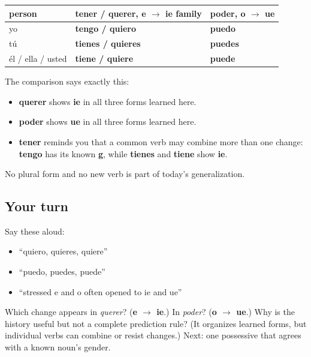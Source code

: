 \begin{grammarlens}[title={Grammar Lens: two changes, one learned frame}]
\noindent
\begin{tabularx}{\linewidth}{@{}>{\raggedright\arraybackslash}X>{\raggedright\arraybackslash}X>{\raggedright\arraybackslash}X@{}}
\toprule
\textbf{person} & \textbf{\textbf{tener / querer}, e $\to$ ie family} & \textbf{\textbf{poder}, o $\to$ ue} \\
\midrule
yo & \textbf{tengo / quiero} & \textbf{puedo} \\
tú & \textbf{tienes / quieres} & \textbf{puedes} \\
él / ella / usted & \textbf{tiene / quiere} & \textbf{puede} \\
\bottomrule
\end{tabularx}

The comparison says exactly this:

\begin{itemize}
\raggedright
  \item \textbf{querer} shows \textbf{ie} in all three forms learned here.
  \item \textbf{poder} shows \textbf{ue} in all three forms learned here.
  \item \textbf{tener} reminds you that a common verb may combine more than one change: \textbf{tengo} has its known \textbf{g}, while \textbf{tienes} and \textbf{tiene} show \textbf{ie}.
\end{itemize}

No plural form and no new verb is part of today's generalization.
\end{grammarlens}

\subsection*{Your turn}
Say these aloud:

\begin{itemize}
\raggedright
  \item “quiero, quieres, quiere”
  \item “puedo, puedes, puede”
  \item “stressed e and o often opened to ie and ue”
\end{itemize}

\begin{tcolorbox}[breakable,colback=teal!4,colframe=teal!35!black,title={Before you move on}]
Which change appears in \emph{querer}? (\textbf{e $\to$ ie}.) In \emph{poder}? (\textbf{o $\to$ ue}.) Why is the history useful but not a complete prediction rule? (It organizes learned forms, but individual verbs can combine or resist changes.) Next: one possessive that agrees with a known noun's gender.
\end{tcolorbox}
